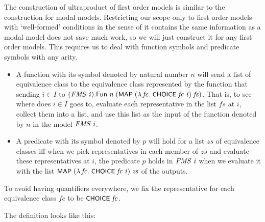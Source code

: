 \documentclass[letterpaper]{article}
\renewcommand{\HOLConst}[1]{{\textsf{\upshape\small #1}}}
\renewcommand{\HOLinline}[1]{\ensuremath{#1}}
\begin{document}
The construction of ultraproduct of first order models is similar to the construction for modal models. Restricting our scope only to first order models with `well-formed' conditions in the sense of it contains the same information as a modal model does not save much work, so we will just construct it for any first order models. This requires us to deal with function symbols and predicate symbols with any arity. 


\begin{itemize}
\item A function with its symbol denoted by natural number $n$ will send a list of equivalence class to the equivalence class represented by the function that sending $i\in I$ to \HOLinline{(\HOLFreeVar{FMS}\;\HOLFreeVar{i}).\HOLFieldName{Fun}\;\HOLFreeVar{n}\;(\HOLConst{MAP}\;(\HOLTokenLambda{}\HOLBoundVar{fc}.\;\HOLConst{CHOICE}\;\HOLBoundVar{fc}\;\HOLFreeVar{i})\;\HOLFreeVar{fs})}. That is, to see where does $i\in I$ goes to, evaluate each representative in the list $fs$ at $i$, collect them into a list, and use this list as the input of the function denoted by $n$ in the model \HOLinline{\HOLFreeVar{FMS}\;\HOLFreeVar{i}}.

\item A predicate with its symbol denoted by $p$ will hold for a list $zs$ of equivalence classes iff when we pick representatives in each member of $zs$ and evaluate these representatives at $i$, the predicate $p$ holds in \HOLinline{\HOLFreeVar{FMS}\;\HOLFreeVar{i}} when we evaluate it with the list \HOLinline{\HOLConst{MAP}\;(\HOLTokenLambda{}\HOLBoundVar{fc}.\;\HOLConst{CHOICE}\;\HOLBoundVar{fc}\;\HOLFreeVar{i})\;\HOLFreeVar{zs}} of the outputs. 
\end{itemize}

To avoid having quantifiers everywhere, we fix the representative for each equivalence class $fc$ to be \HOLinline{\HOLConst{CHOICE}\;\HOLFreeVar{fc}}.


The definition looks like this:
\end{document}
